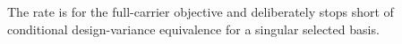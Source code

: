 The rate is for the full-carrier objective and deliberately stops short of conditional design-variance equivalence for a singular selected basis.
